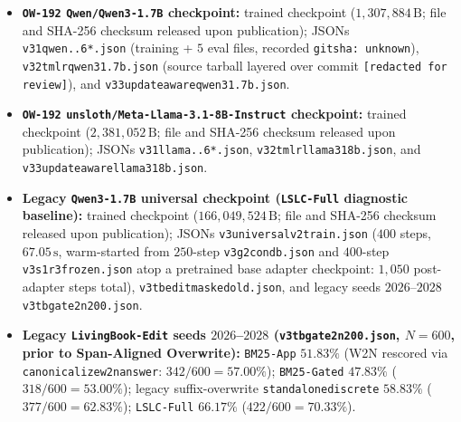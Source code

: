 \documentclass[10pt]{article}
\renewcommand{\_}{\origunderscore\allowbreak}
\begin{document}
\begin{itemize}
    \item \textbf{\texttt{OW-192} \texttt{Qwen/Qwen3-1.7B} checkpoint:} trained checkpoint ($1{,}307{,}884\,\text{B}$; file and SHA-256 checksum released upon publication); JSONs \texttt{v31\_qwen\_1..6*.json} (training + $5$ eval files, recorded \texttt{git\_sha: unknown}), \texttt{v32\_tmlr\_qwen3\_1.7b.json} (source tarball layered over commit \texttt{[redacted for review]}), and \texttt{v33\_update\_aware\_qwen3\_1.7b.json}.
    \item \textbf{\texttt{OW-192} \texttt{unsloth/\allowbreak Meta-Llama-3.1-8B-Instruct} checkpoint:} trained checkpoint ($2{,}381{,}052\,\text{B}$; file and SHA-256 checksum released upon publication); JSONs \texttt{v31\_llama\_1..6*.json}, \texttt{v32\_tmlr\_llama31\_8b.json}, and \texttt{v33\_update\_aware\_llama31\_8b.json}.
    \item \textbf{Legacy \texttt{Qwen3-1.7B} universal checkpoint (\texttt{LSLC-Full} diagnostic baseline):} trained checkpoint ($166{,}049{,}524\,\text{B}$; file and SHA-256 checksum released upon publication); JSONs \texttt{v3\_universal\_\allowbreak v2\_train.json} ($400$ steps, $67.05\,\text{s}$, warm-started from $250$-step \texttt{v3\_g2\_cond\_b.json} and $400$-step \texttt{v3\_s1\_r3\_frozen.json} atop a pretrained base adapter checkpoint: $1{,}050$ post-adapter steps total), \texttt{v3\_tb\_1\_edit\_masked\_old.json}, and legacy seeds $2026$--$2028$ \texttt{v3\_tb\_3\_gate2\_n200.json}.
    \item \textbf{Legacy \texttt{LivingBook-Edit} seeds $2026$--$2028$ (\texttt{v3\_tb\_3\_gate2\_n200.json}, $N=600$, prior to Span-Aligned Overwrite):} \texttt{BM25-App} $51.83\%$ (W2N rescored via \texttt{canonicalize\_w2n\_answer}: $342/600 = 57.00\%$); \texttt{BM25-Gated} $47.83\%$ ($318/600 = 53.00\%$); legacy suffix-overwrite \texttt{standalone\_discrete} $58.83\%$ ($377/600 = 62.83\%$); \texttt{LSLC-Full} $66.17\%$ ($422/600 = 70.33\%$).
\end{itemize}

\clearpage
\end{document}
